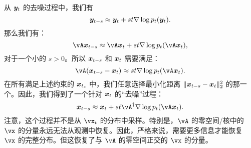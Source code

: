 \documentclass[../../book-main_zh.tex]{subfiles}
\begin{document}
从 $\bm{y}_t$ 的去噪过程中，我们有
\begin{equation}
    \bm{y}_{t-s} \approx  \bm{y}_t + st \nabla \log p_t(\bm{y}_t).
\end{equation}
那么我们有：
\begin{equation}
    \vA\x_{t-s} \approx   \vA\x_t + st \nabla \log p_t(\vA \x_t),
\end{equation}
对于一个小的 $s >0$。所以 $\bm{x}_{t-s}$ 和 $\bm{x}_t$ 需要满足：
\begin{equation}
    \vA(\x_{t-s} - \x_t) \approx st \nabla \log p_t(\vA\x_t). 
\end{equation}
在所有满足上述约束的 $\bm{x}_{t_s}$ 中，我们任意选择最小化距离 $\|\bm{x}_{t-s} - \bm{x}_t\|_2^2$ 的那一个。因此，我们得到了一个针对 $\bm{x}_t$ 的“去噪”过程：
\begin{equation}
    \x_{t-s}  \approx \x_t + st\vA^\dagger \nabla \log p_t(\vA\x_t). 
\label{eqn:denoising-projection}
\end{equation}
注意，这个过程并不是从 $\vx_t$ 的分布中采样。特别是，$\vA$ 的零空间/核中的 $\vx$ 的分量永远无法从观测中恢复。因此，严格来说，需要更多信息才能恢复 $\vx$ 的完整分布。但这恢复了与 $\vA$ 的零空间正交的 $\vx$ 的分量。

\end{document}
